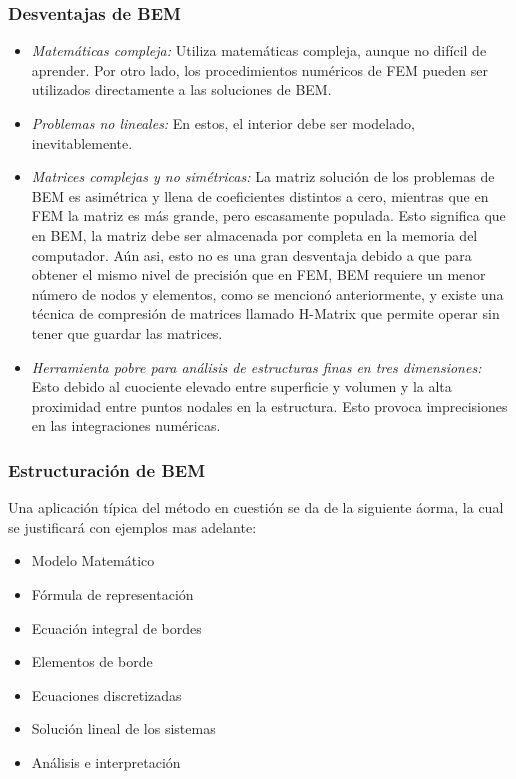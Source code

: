 \documentclass[12pt,letterpaper]{article}
\numberwithin{equation}{section}
\begin{document}
\subsubsection{Desventajas de BEM}
\begin{itemize}
	\item \textit{Matemáticas compleja:} Utiliza matemáticas compleja, aunque no difícil de aprender. Por otro lado, los procedimientos numéricos de FEM pueden ser utilizados directamente a las soluciones de BEM.
	\item \textit{Problemas no lineales:} En estos, el interior debe ser modelado, inevitablemente. 
	\item \textit{Matrices complejas y no simétricas:} La matriz solución de los problemas de BEM es asimétrica y llena de coeficientes distintos a cero, mientras que en FEM la matriz es más grande, pero escasamente populada. Esto significa que en BEM, la matriz debe ser almacenada por completa en la memoria del computador. Aún asi, esto no es una gran desventaja debido a que para obtener el mismo nivel de precisión que en FEM, BEM requiere un menor número de nodos y elementos, como se mencionó anteriormente, y existe una técnica de compresión de matrices llamado H-Matrix que permite operar sin tener que guardar las matrices.
	\item \textit{Herramienta pobre para análisis de estructuras finas en tres dimensiones:} Esto debido al cuociente elevado entre superficie y volumen y la alta proximidad entre puntos nodales en la estructura. Esto provoca imprecisiones en las integraciones numéricas.
\end{itemize}

\subsubsection{Estructuración de BEM}
Una aplicación típica del método en cuestión se da de la siguiente áorma, la cual se justificará con ejemplos mas adelante:

\begin{itemize}
	\item Modelo Matemático
	\item Fórmula de representación
	\item Ecuación integral de bordes
	\item Elementos de borde
	\item Ecuaciones discretizadas
	\item Solución lineal de los sistemas
	\item Análisis e interpretación
\end{itemize}
\end{document}
